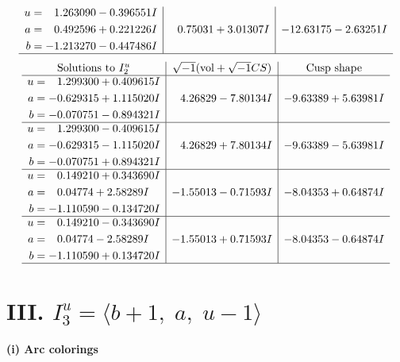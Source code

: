 \documentclass[1p]{elsarticle_modified}
\theoremstyle{definition}
\newcommand{\I}{\sqrt{-1}}
\begin{document}
$$\begin{array}{c|c|c}
\begin{aligned}
u &= \phantom{-}1.263090 - 0.396551 I \\
a &= \phantom{-}0.492596 + 0.221226 I \\
b &= -1.213270 - 0.447486 I\end{aligned}
 & \phantom{-}0.75031 + 3.01307 I & -12.63175 - 2.63251 I\\
 \hline 
 \end{array}$$\newpage$$\begin{array}{c|c|c}  
\text{Solutions to }I^u_{2}& \I (\text{vol} + \sqrt{-1}CS) & \text{Cusp shape}\\
 \hline 
\begin{aligned}
u &= \phantom{-}1.299300 + 0.409615 I \\
a &= -0.629315 + 1.115020 I \\
b &= -0.070751 - 0.894321 I\end{aligned}
 & \phantom{-}4.26829 - 7.80134 I & -9.63389 + 5.63981 I \\ \hline\begin{aligned}
u &= \phantom{-}1.299300 - 0.409615 I \\
a &= -0.629315 - 1.115020 I \\
b &= -0.070751 + 0.894321 I\end{aligned}
 & \phantom{-}4.26829 + 7.80134 I & -9.63389 - 5.63981 I \\ \hline\begin{aligned}
u &= \phantom{-}0.149210 + 0.343690 I \\
a &= \phantom{-}0.04774 + 2.58289 I \\
b &= -1.110590 - 0.134720 I\end{aligned}
 & -1.55013 - 0.71593 I & -8.04353 + 0.64874 I \\ \hline\begin{aligned}
u &= \phantom{-}0.149210 - 0.343690 I \\
a &= \phantom{-}0.04774 - 2.58289 I \\
b &= -1.110590 + 0.134720 I\end{aligned}
 & -1.55013 + 0.71593 I & -8.04353 - 0.64874 I\\
 \hline 
 \end{array}$$\newpage\newpage\renewcommand{\arraystretch}{1}
\centering \section*{III. $I^u_{3}= \langle b+1,\;a,\;u-1 \rangle$}
\flushleft \textbf{(i) Arc colorings}\\
\end{document}
